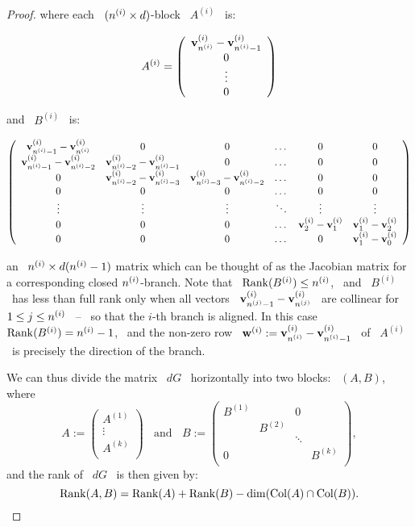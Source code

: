 \begin{proof}
\noindent where each \ $(n\sp{({i})}\times d)$-block \ $A^{(i)}$ \ is:

$$
A^{(i)}=\left(
\begin{array}{c}
      \mathbf{v}\sp{({i})}_{n\sp{({i})}}-\mathbf{v}\sp{({i})}_{n\sp{({i})}-1}\\
       0    \\
     \vdots \\
        0   \\
\end{array}
\right)
$$

\noindent and \ $B^{(i)}$ \ is:

$$
\left(
\begin{array}{cccccc}
\mathbf{v}\sp{({i})}_{n\sp{({i})}-1}-\mathbf{v}\sp{({i})}_{n\sp{({i})}} &  0 & 0 &\dotsc & 0 & 0 \\
\mathbf{v}\sp{({i})}_{n\sp{({i})}-1}-\mathbf{v}\sp{({i})}_{n\sp{({i})}-2} &
\mathbf{v}\sp{({i})}_{n\sp{({i})}-2}-\mathbf{v}\sp{({i})}_{n\sp{({i})}-1} &
0 &\dotsc & 0 & 0 \\ 0 &
\mathbf{v}\sp{({i})}_{n\sp{({i})}-2}-\mathbf{v}\sp{({i})}_{n\sp{({i})}-3} &
\mathbf{v}\sp{({i})}_{n\sp{({i})}-3}-\mathbf{v}\sp{({i})}_{n\sp{({i})}-2}
  & \dotsc & 0 & 0 \\
0  & 0 & 0 & \dotsc & 0 & 0  \\
\vdots  & \vdots & \vdots & \ddots & \vdots & \vdots  \\ 0  & 0 &
0 & \dotsc & \mathbf{v}\sp{({i})}_{2}-\mathbf{v}\sp{({i})}_{1}  & \mathbf{v}\sp{({i})}_{1}-\mathbf{v}\sp{({i})}_{2} \\ 0
& 0 & 0 & \dotsc & 0 & \mathbf{v}\sp{({i})}_{1}-\mathbf{v}\sp{({i})}_{0} \end{array} \right)
$$

\noindent an \ $n\sp{({i})}\times d(n\sp{({i})}-1)$ matrix which can be
thought of as the Jacobian matrix for a corresponding closed
$n\sp{({i})}$-branch. Note that \ $\operatorname{Rank}(B^{(i)})\leq n\sp{({i})}$, \ and \
$B^{(i)}$ \ has less than full rank only when all vectors \
$\mathbf{v}\sp{({i})}_{n\sp{({j})}-1}-\mathbf{v}\sp{({i})}_{n\sp{({j})}}$ \ are collinear for \ $1\leq
j\leq n\sp{({i})}$ \ -- \ so that the $i$-th branch is aligned. In this
case \ $\operatorname{Rank}(B^{(i)})=n\sp{({i})}-1$, \ and the non-zero row \
$\mathbf{w}^{(i)}:=\mathbf{v}\sp{({i})}_{n\sp{({i})}}-\mathbf{v}\sp{({i})}_{n\sp{({i})}-1}$ \ of \ $A^{(i)}$ \
is precisely the direction of the branch.

We can thus divide the matrix \ $dG$ \ horizontally into two
blocks: \ $(A,B)$, where $$  A:=\left( \begin{array}{c}
  A^{(1)} \\
  \vdots \\
  A^{(k)} \\
\end{array}\right)
 \ \ \ \ \text{and} \ \ \ \ B:=\left(
\begin{array}{cccc}
    B^{(1)}& & 0&\\
     &B^{(2)}& &\\
      & & \ddots & \\
      0 &  & & B^{(k)} \\
\end{array}
\right),
$$
and the rank of \ $dG$ \ is then given by:
\begin{equation}\label{eone} \rank(A,B)=\rank(A)
+\rank(B)-\dim(\col(A) \cap\col(B) ). \end{equation}


\end{proof}
